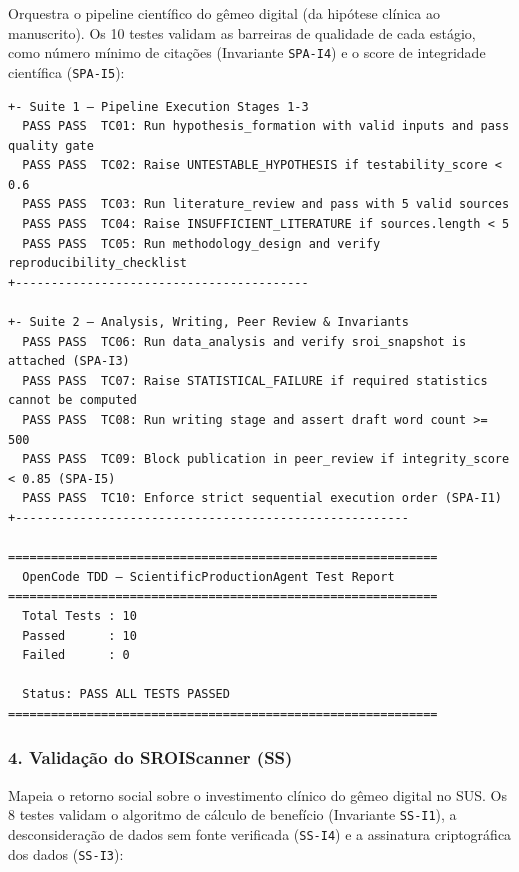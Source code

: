 Orquestra o pipeline científico do gêmeo digital (da hipótese clínica ao manuscrito). Os 10 testes validam as barreiras de qualidade de cada estágio, como número mínimo de citações (Invariante \texttt{SPA-I4}) e o score de integridade científica (\texttt{SPA-I5}):

\begin{lstlisting}[style=bashstyle, caption={Saída do Executor de Testes do OpenCode ScientificProductionAgent}, label={lst:tdd_spa_output}]
+- Suite 1 — Pipeline Execution Stages 1-3
  PASS PASS  TC01: Run hypothesis_formation with valid inputs and pass quality gate
  PASS PASS  TC02: Raise UNTESTABLE_HYPOTHESIS if testability_score < 0.6
  PASS PASS  TC03: Run literature_review and pass with 5 valid sources
  PASS PASS  TC04: Raise INSUFFICIENT_LITERATURE if sources.length < 5
  PASS PASS  TC05: Run methodology_design and verify reproducibility_checklist
+-----------------------------------------

+- Suite 2 — Analysis, Writing, Peer Review & Invariants
  PASS PASS  TC06: Run data_analysis and verify sroi_snapshot is attached (SPA-I3)
  PASS PASS  TC07: Raise STATISTICAL_FAILURE if required statistics cannot be computed
  PASS PASS  TC08: Run writing stage and assert draft word count >= 500
  PASS PASS  TC09: Block publication in peer_review if integrity_score < 0.85 (SPA-I5)
  PASS PASS  TC10: Enforce strict sequential execution order (SPA-I1)
+-------------------------------------------------------

============================================================
  OpenCode TDD — ScientificProductionAgent Test Report
============================================================
  Total Tests : 10
  Passed      : 10
  Failed      : 0

  Status: PASS ALL TESTS PASSED
============================================================
\end{lstlisting}

\subsubsection*{4. Validação do SROIScanner (SS)}

Mapeia o retorno social sobre o investimento clínico do gêmeo digital no SUS. Os 8 testes validam o algoritmo de cálculo de benefício (Invariante \texttt{SS-I1}), a desconsideração de dados sem fonte verificada (\texttt{SS-I4}) e a assinatura criptográfica dos dados (\texttt{SS-I3}):

